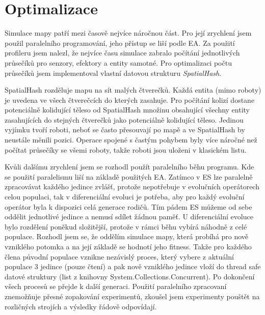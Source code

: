 \section*{Optimalizace}
Simulace mapy patří mezi časově nejvíce náročnou část. Pro její zrychlení jsem použil paralelního programování, jeho přístup se liší podle EA. Za použití profileru jsem nalezl, že nejvíce času simulace zabralo počítání jednotlivých průsečíků pro senzory, efektory a entity samotné. Pro optimalizaci počtu průsečíků jsem implementoval vlastní datovou strukturu \textit{SpatialHash}. 
\par 
SpatialHash rozděluje mapu na sít malých čtverečků. Každá entita (mimo roboty) je uvedena ve všech čtverečcích do kterých zasahuje. Pro počítání kolizí dostane potenciálně kolidující těleso od SpatialHash množinu obsahující všechny entity zasahujících do stejných čtverečků jako potenciálně kolidující těleso. Jedinou vyjímku tvoří roboti, neboť se často přesouvají po mapě a ve SpatialHash by neustále měnili pozici. Operace spojené s častým pohybem byly více náročné než počítat průsečíky se všemi roboty, takže roboti jsou uloženi v klasickém listu.
\par
Kvůli dalšímu zrychlení jsem se rozhodl použít paralelního běhu programu. Kde se použití paralelismu liší na základě použitých EA. Zatímco v ES lze paralelně zpracovávat každého jedince zvlášť, protože nepotřebuje v evolučních operátorech celou populaci, tak v diferenciální evoluci je potřeba, aby pro každý evoluční operátor byla k dispozici celá generace rodičů. Tím pádem ES můžeme od sebe oddělit jednotlivé jedince a nemusí sdílet žádnou paměť. U diferenciální evoluce bylo rozdělení poněkud složitější, protože v rámci běhu vybírá náhodně z celé populace. Rozhodl jsem se, že oddělím simulace mapy, která probíhá pro nově vzniklého potomka a na její základě se hodnotí jeho fitness. Takže pro každého člena původní populace vznikne nezávislý proces, který vybere z aktuální populace 3 jedince (pouze čtení) a pak nově vzniklého jedince vloží do thread safe datové struktury (list z knihovny System.Collections.Concurrent). Po dokončení všech procesů se přejde k další generaci. Použití paralelního zpracovaní znemožňuje přesné zopakování experimentů, zkoušel jsem experimenty pouštět na rozličných strojích a výsledky řádově odpovídají.  
\clearpage

